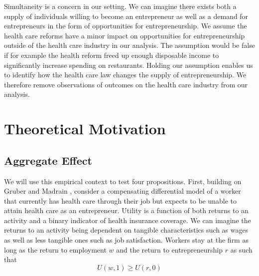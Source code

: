 \documentclass[12pt]{article}
\begin{document}
Simultaneity is a concern in our setting. We can imagine there exists both a supply of individuals willing to become an entrepreneur as well as a demand for entrepreneurs in the form of opportunities for entrepreneurship. We assume the health care reforms have a minor impact on opportunities for entrepreneurship outside of the health care industry in our analysis. The assumption would be false if for example the health reform freed up enough disposable income to significantly increase spending on restaurants. Holding our assumption enables us to identify how the health care law changes the supply of entrepreneurship. We therefore remove observations of outcomes on the health care industry from our analysis. 

\begin{comment}

Another concern is whether the stable unit treatment value assumption (SUTVA) holds. It can fail if for example entrepreneurs moved from Rhode Island to Massachusetts to take advantage of the health reform. If this occurs, we expect our results to be biased upwards. We believe our use of synthetic controls based on counties across the US helps isolates us from violations since any mobility . 

\end{comment}

\section{Theoretical Motivation}
\label{sec:model}

\subsection{Aggregate Effect}

We will use this empirical context to test four propositions. First, building on Gruber and Madrain \citep{gruber2004health}, consider a compensating differential model of a worker that currently has health care through their job but expects to be unable to attain health care as an entrepreneur. Utility is a function of both returns to an activity and a binary indicator of health insurance coverage. We can imagine the returns to an activity being dependent on tangible characteristics such as wages as well as less tangible ones such as job satisfaction. Workers stay at the firm as long as the return to employment $w$ and the return to entrepreneurship $r$ as such that
$$U(w,1) \ge U(r,0)$$
\end{document}
